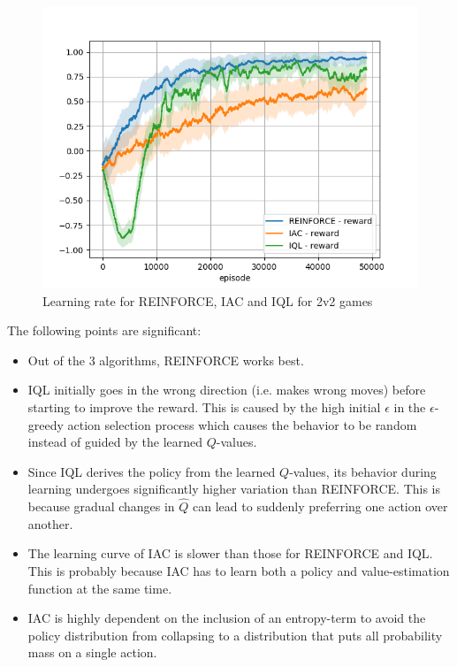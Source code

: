 \begin{figure}[htp]
    \centering
    \includegraphics[width=14cm]{images/experiment4/compare_reward.png}
    \caption{Learning rate for REINFORCE, IAC and IQL for 2v2 games}
    \label{fig:compare_reward}
\end{figure}

The following points are significant:
\begin{itemize}
    \item Out of the 3 algorithms, REINFORCE works best.
    \item IQL initially goes in the wrong direction (i.e. makes wrong moves) before starting to improve the reward. This is caused by the high initial $\epsilon$ in the $\epsilon$-greedy action selection process which causes the behavior to be random instead of guided by the learned $Q$-values.
    \item Since IQL derives the policy from the learned $Q$-values, its behavior during learning undergoes significantly higher variation than REINFORCE. This is because gradual changes in $\hat Q$ can lead to suddenly preferring one action over another.
    \item The learning curve of IAC is slower than those for REINFORCE and IQL. This is probably because IAC has to learn both a policy and value-estimation function at the same time.
    \item IAC is highly dependent on the inclusion of an entropy-term to avoid the policy distribution from collapsing to a distribution that puts all probability mass on a single action.
\end{itemize}

